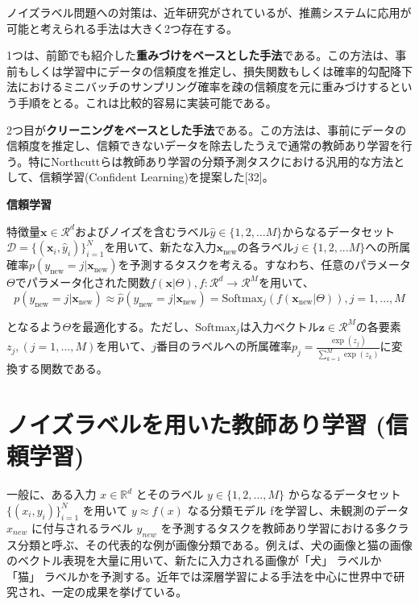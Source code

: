\documentclass[11pt,a4paper]{article}
\begin{document}
ノイズラベル問題への対策は、近年研究がされているが、推薦システムに応用が可能と考えられる手法は大きく2つ存在する。

1つは、前節でも紹介した\textbf{重みづけをベースとした手法}である。この方法は、事前もしくは学習中にデータの信頼度を推定し、損失関数もしくは確率的勾配降下法におけるミニバッチのサンプリング確率を疎の信頼度を元に重みづけするという手順をとる。これは比較的容易に実装可能である。

2つ目が\textbf{クリーニングをベースとした手法}である。この方法は、事前にデータの信頼度を推定し、信頼できないデータを除去したうえで通常の教師あり学習を行う。特にNorthcuttらは教師あり学習の分類予測タスクにおける汎用的な方法として、信頼学習(Confident Learning)を提案した[32]。

\textbf{信頼学習}

特徴量$\bm{x} \in \mathcal{R}^d$およびノイズを含むラベル$\hat{y} \in \{ 1, 2, ... M \}$からなるデータセット$\mathcal{D} = \{ (\bm{x}_i, \hat{y}_i) \}_{i=1}^N$を用いて、新たな入力$\bm{x}_{\text{new}}$の各ラベル$j \in \{ 1, 2, ... M\}$への所属確率$p(y_{\text{new}} = j | \bm{x}_{\text{new}})$を予測するタスクを考える。すなわち、任意のパラメータ$\Theta$でパラメータ化された関数$f(\bm{x}|\Theta), f:\mathcal{R}^d \to \mathcal{R}^M$を用いて、
$$
  p(y_{\text{new}} = j | \bm{x}_{\text{new}}) \approx \hat{p}(y_{\text{new}} = j | \bm{x}_{\text{new}}) = \text{Softmax}_j(f(\bm{x}_{\text{new}} | \Theta)), j=1,...,M
$$

となるよう$\Theta$を最適化する。ただし、$\text{Softmax}_j$は入力ベクトル$\bm{z} \in \mathcal{R}^M$の各要素$z_j,(j=1,...,M)$を用いて、$j$番目のラベルへの所属確率$p_j = \frac{\exp(z_j)}{\sum_{k=1}^M \exp(z_k)}$に変換する関数である。




\section{ノイズラベルを用いた教師あり学習 (信頼学習)}
一般に、ある入力 $x\in\mathbb{R}^{d}$ とそのラベル $y\in\{1,2,...,M\}$ からなるデータセット $\{(x_{i},y_{i})\}_{i=1}^{N}$ を用いて $y\approx f(x)$ なる分類モデル fを学習し、未観測のデータ $x_{new}$ に付与されるラベル $y_{new}$ を予測するタスクを教師あり学習における多クラス分類と呼ぶ、その代表的な例が画像分類である。例えば、犬の画像と猫の画像のベクトル表現を大量に用いて、新たに入力される画像が「犬」 ラベルか 「猫」 ラベルかを予測する。近年では深層学習による手法を中心に世界中で研究され、一定の成果を挙げている。
\end{document}
